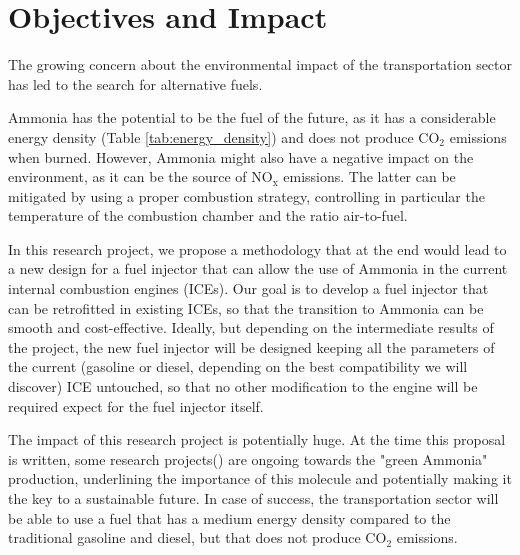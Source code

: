 \section{Objectives and Impact}
\label{sec:objectives_and_impact}

The growing concern about the environmental impact of the transportation sector has led to the search for alternative fuels.

Ammonia has the potential to be the fuel of the future, as it has a considerable energy density (Table \ref{tab:energy_density}) and does not produce $\mathrm{CO_2}$ emissions when burned.
However, Ammonia might also have a negative impact on the environment, as it can be the source of $\mathrm{NO_x}$ emissions\cite{ammonia-oxidation}.
The latter can be mitigated by using a proper combustion strategy, controlling in particular the temperature of the combustion chamber and the ratio air-to-fuel\cite{ammonia-oxidation}.

In this research project, we propose a methodology that at the end would lead to a new design for a fuel injector that can allow the use of Ammonia in the current internal combustion engines (ICEs).
Our goal is to develop a fuel injector that can be retrofitted in existing ICEs, so that the transition to Ammonia can be smooth and cost-effective.
Ideally, but depending on the intermediate results of the project, the new fuel injector will be designed keeping all the parameters of the current (gasoline or diesel, depending on the best compatibility we will discover) ICE untouched, so that no other modification to the engine will be required expect for the fuel injector itself.

The impact of this research project is potentially huge.
At the time this proposal is written, some research projects(\cite{green-ammonia-1, green-ammonia-2}) are ongoing towards the "green Ammonia" production, underlining the importance of this molecule and potentially making it the key to a sustainable future.
In case of success, the transportation sector will be able to use a fuel that has a medium energy density compared to the traditional gasoline and diesel, but that does not produce $\mathrm{CO_2}$ emissions.


